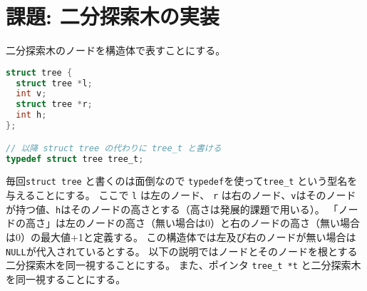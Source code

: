 \documentclass[a4paper,twoside,onecolumn,openany,article]{memoir}
\theoremstyle{remark}
\begin{document}
\section{課題: 二分探索木の実装}
二分探索木のノードを構造体で表すことにする。
\begin{lstlisting}[basicstyle=\ttfamily\small,showstringspaces=false,language=C,frame=single]
struct tree {
  struct tree *l;
  int v;
  struct tree *r;
  int h;
};

// 以降 struct tree の代わりに tree_t と書ける
typedef struct tree tree_t;
\end{lstlisting}
毎回\texttt{struct tree} と書くのは面倒なので \texttt{typedef}を使って\texttt{tree\_t} という型名を与えることにする。
ここで \texttt{l} は左のノード、 \texttt{r} は右のノード、\texttt{v}はそのノードが持つ値、\texttt{h}はそのノードの高さとする（高さは発展的課題で用いる）。
「ノードの高さ」は左のノードの高さ（無い場合は0）と右のノードの高さ（無い場合は0）の最大値+1と定義する。
この構造体では左及び右のノードが無い場合は\texttt{NULL}が代入されているとする。
以下の説明ではノードとそのノードを根とする二分探索木を同一視することにする。
また、ポインタ \texttt{tree\_t *t} と二分探索木を同一視することにする。
\end{document}
